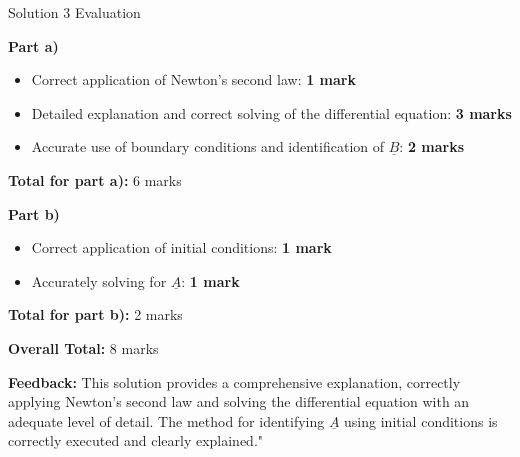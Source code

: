 \documentclass[a4paper,11pt]{article}
\begin{document}
Solution 3 Evaluation

\textbf{Part a)}
\begin{itemize}
    \item Correct application of Newton's second law: \textbf{1 mark}
    \item Detailed explanation and correct solving of the differential equation: \textbf{3 marks}
    \item Accurate use of boundary conditions and identification of \( \underline{B} \): \textbf{2 marks}
\end{itemize}

\textbf{Total for part a):} 6 marks

\textbf{Part b)}
\begin{itemize}
    \item Correct application of initial conditions: \textbf{1 mark}
    \item Accurately solving for \( \underline{A} \): \textbf{1 mark}
\end{itemize}

\textbf{Total for part b):} 2 marks

\textbf{Overall Total:} 8 marks

\textbf{Feedback:} This solution provides a comprehensive explanation, correctly applying Newton's second law and solving the differential equation with an adequate level of detail. The method for identifying \( \underline{A} \) using initial conditions is correctly executed and clearly explained."
\end{document}
